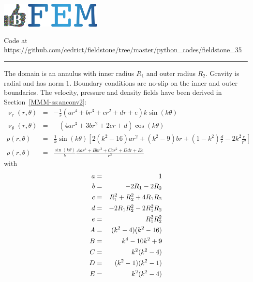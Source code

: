 \includegraphics[height=1.25cm]{images/pictograms/benchmark}
\includegraphics[height=1.25cm]{images/pictograms/FEM}




\begin{center}
Code at \url{https://github.com/cedrict/fieldstone/tree/master/python_codes/fieldstone_35}
\end{center}

\par\noindent\rule{\textwidth}{0.4pt}

The domain is an annulus with inner radius $R_1$ and outer radius $R_2$. Gravity is radial 
and has norm 1. 
Boundary conditions are no-slip on the inner and outer boundaries.
The velocity, pressure and density fields have been derived in Section~\ref{MMM-ss:anconv2}:
\begin{eqnarray}
\upnu_r (r,\theta)&=& -\frac{1}{r} (
{ ar^4}
+{ br^3}
+{c r^2}
+ {dr}
+{e}
)k\sin(k\theta)\\
\upnu_\theta(r,\theta)&=& -(4ar^3+3br^2 +2cr + d ) \cos(k\theta) \\
p(r,\theta) &= &
\frac{1}{k}\sin(k\theta) 
\left[
2(k^2-16)ar^2
+(k^2-9)br
+(1-k^2)\frac{d}{r}
-2k^2\frac{e}{r^2}
\right] \\
\rho(r,\theta)&=&\frac{\sin(k\theta)}{k}
\frac{
A{ ar^4}+
B{ br^3}+
C{c r^2} +
D {dr}+
E{e}
}{r^3}
\end{eqnarray}
with
\begin{eqnarray}
a &=& 1  \nonumber\\
b &=& -2R_1-2R_2 \nonumber\\
c &=& R_1^2+R_2^2+4R_1R_2 \nonumber\\
d &=& -2R_1R_2^2-2R_1^2R_2 \nonumber\\
e &=& R_1^2R_2^2 \nonumber\\
A &=& (k^2-4)(k^2-16)\nonumber \\
B &=& k^4-10k^2+9\nonumber    \\
C &=& k^2(k^2-4)  \nonumber    \\
D &=& (k^2-1)(k^2-1) \nonumber     \\
E &=& k^2(k^2-4) \nonumber
\end{eqnarray}

